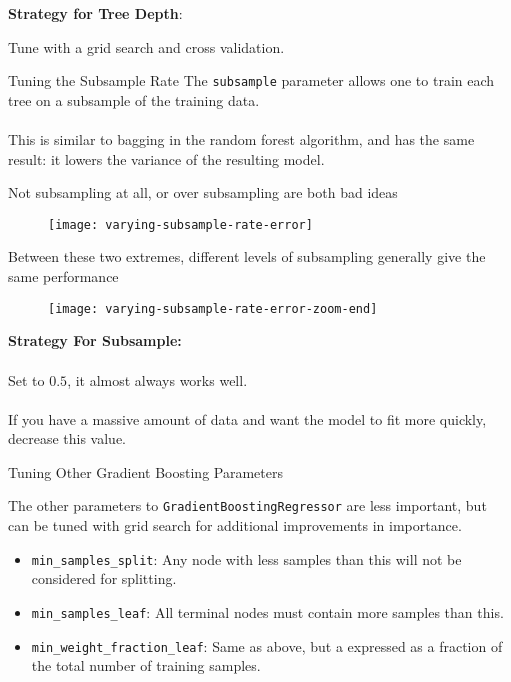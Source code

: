 %
\begin{frame}
\textbf{Strategy for Tree Depth}:

Tune with a grid search and cross validation.
  
\end{frame}
%
\begin{frame}{Tuning the Subsample Rate}
The \texttt{subsample} parameter allows one to train each tree on a subsample of the training data.\\~\\

This is similar to bagging in the random forest algorithm, and has the same result: it lowers the variance of the resulting model.
\end{frame}
%
\begin{frame}
Not subsampling at all, or over subsampling are both bad ideas

  \begin{figure}
    \texttt{[image: varying-subsample-rate-error]}
  \end{figure}
 
\end{frame}
%
\begin{frame}
Between these two extremes, different levels of subsampling generally give the same performance

  \begin{figure}
    \texttt{[image: varying-subsample-rate-error-zoom-end]}
  \end{figure}
  
\end{frame}
%
\begin{frame}
\textbf{Strategy For Subsample:}\\~\\

Set to $0.5$, it almost always works well.\\~\\

If you have a massive amount of data and want the model to fit more quickly, decrease this value.
\end{frame}
%
\begin{frame}{Tuning Other Gradient Boosting Parameters}

The other parameters to \texttt{GradientBoostingRegressor} are less important, but can be tuned with grid search for additional improvements in importance.

\begin{itemize}
  \item \texttt{min\_samples\_split}: Any node with less samples than this will not be considered for splitting.
  \item \texttt{min\_samples\_leaf}: All terminal nodes must contain more samples than this.
  \item \texttt{min\_weight\_fraction\_leaf}: Same as above, but a expressed as a fraction of the total number of training samples.
\end{itemize}

\end{frame}
